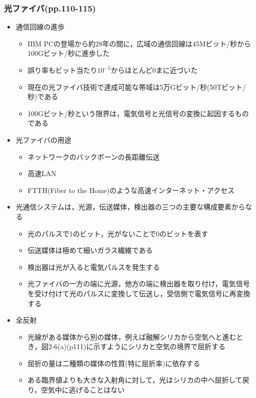 \documentclass[a4paper]{ltjsarticle}
\begin{document}
		\subsubsection{光ファイバ(pp.110-115)}
			\begin{itemize}
				\item 通信回線の進歩
				\begin{itemize}
					\item IBM PCの登場から約28年の間に，広域の通信回線は45Mビット/秒から100Gビット/秒に進歩した
					\item 誤り率もビット当たり$10^{-5}$からほとんど0まに近づいた
					\item 現在の光ファイバ技術で達成可能な帯域は5万Gビット/秒(50Tビット/秒)である
					\item 100Gビット/秒という限界は，電気信号と光信号の変換に起因するものである
				\end{itemize}
				\item 光ファイバの用途
				\begin{itemize}
					\item ネットワークのバックボーンの長距離伝送
					\item 高速LAN
					\item FTTH(Fiber to the Home)のような高速インターネット・アクセス
				\end{itemize}
				\item 光通信システムは，光源，伝送媒体，検出器の三つの主要な構成要素からなる
				\begin{itemize}
					\item 光のパルスで1のビット，光がないことで0のビットを表す
					\item 伝送媒体は極めて細いガラス繊維である
					\item 検出器は光が入ると電気パルスを発生する
					\item 光ファイバの一方の端に光源，他方の端に検出器を取り付け，電気信号を受け付けて光のパルスに変換して伝送し，受信側で電気信号に再変換する
				\end{itemize}
				\item 全反射
				\begin{itemize}
					\item 光線がある媒体から別の媒体，例えば融解シリカから空気へと進むとき，図2-6(a)(p111)に示すようにシリカと空気の境界で屈折する
					\item 屈折の量は二種類の媒体の性質(特に屈折率)に依存する
					\item ある臨界値よりも大きな入射角に対して，光はシリカの中へ屈折して戻り，空気中に逃げることはない

\end{itemize}
\end{itemize}
\end{document}
